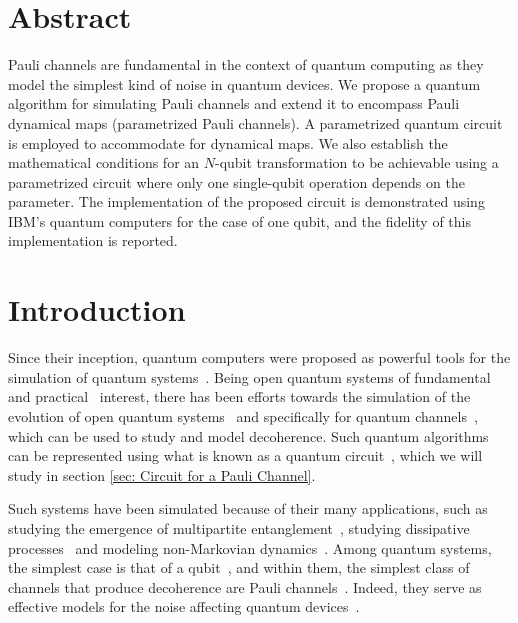 \documentclass[10pt,letterpaper]{article} %
\begin{document}
\section*{Abstract}
Pauli channels are fundamental in the context of quantum computing as they
model the simplest kind of noise in quantum devices.  We propose a quantum
algorithm for simulating
Pauli channels 
and extend it to encompass Pauli dynamical maps 
(parametrized Pauli channels).
A parametrized quantum circuit is employed to accommodate for dynamical maps. 
We also establish the mathematical conditions for an
$N$-qubit transformation to be achievable using a parametrized circuit where
only one single-qubit operation depends on the parameter. 
The implementation of the proposed circuit is demonstrated using IBM's quantum computers 
for the case of one qubit, and the fidelity of this implementation is reported. 




\section{Introduction} %



Since their inception, quantum computers were proposed as powerful tools for
the simulation of quantum systems~\cite{feynman1982simulating}.  Being open
quantum systems of fundamental~\cite{Zur91,RevModPhys.76.1267} and
practical~\cite{breuer2007theory} interest, there has been efforts towards the
simulation of the evolution of open quantum systems~\cite{Garcia, Wang,Weimer}
and specifically for quantum channels~\cite{He-Lu,Xin,Wei,Zanetti}, 
which can be used to study and model decoherence.
Such quantum algorithms can be represented using what is known as a quantum
circuit~\cite{chuangbook}, which we will study in section \ref{sec: Circuit for a Pauli Channel}.

Such systems have been simulated because of their many applications, such as
studying the emergence of multipartite entanglement~\cite{Andrea,Andrea_AD},
studying dissipative processes~\cite{Barreiro} and modeling non-Markovian
dynamics~\cite{Marsden}.  Among quantum systems, the simplest case is that of a
qubit~\cite{chuangbook}, and within them, the simplest class of channels that
produce decoherence are Pauli channels~\cite{geometry,Zbigniew,Davalos}.
Indeed, they serve as effective models for the noise affecting quantum
devices~\cite{Flammia}.
\end{document}
